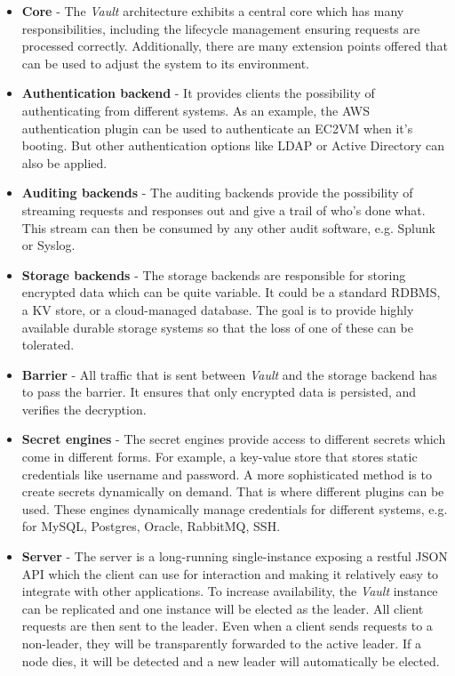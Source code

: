 \documentclass[runningheads]{llncs}
\begin{document}
\begin{itemize}

\setlength\itemsep{1mm}

\item \textbf{Core} - The \textit{Vault} architecture exhibits a central core which has many responsibilities, including the lifecycle management ensuring requests are processed correctly. Additionally, there are many extension points offered that can be used to adjust the system to its environment.

\item \textbf{Authentication backend} - It provides clients the possibility of authenticating from different systems. As an example, the AWS authentication plugin can be used to authenticate an EC2VM when it's booting. But other authentication options like LDAP or Active Directory can also be applied.

\item \textbf{Auditing backends} - The auditing backends provide the possibility of streaming requests and responses out and give a trail of who's done what. This stream can then be consumed by any other audit software, e.g. Splunk or Syslog.

\item \textbf{Storage backends} - The storage backends are responsible for storing encrypted data which can be quite variable. It could be a standard RDBMS, a KV store, or a cloud-managed database. The goal is to provide highly available durable storage systems so that the loss of one of these can be tolerated.

\item \textbf{Barrier} - All traffic that is sent between \textit{Vault} and the storage backend has to pass the barrier. It ensures that only encrypted data is persisted, and verifies the decryption.

\item \textbf{Secret engines} - The secret engines provide access to different secrets which come in different forms. For example, a key-value store that stores static credentials like username and password. A more sophisticated method is to create secrets dynamically on demand. That is where different plugins can be used. These engines dynamically manage credentials for different systems, e.g. for MySQL, Postgres, Oracle, RabbitMQ, SSH.

\item \textbf{Server} - The server is a long-running single-instance exposing a restful JSON API which the client can use for interaction and making it relatively easy to integrate with other applications. To increase availability, the \textit{Vault} instance can be replicated and one instance will be elected as the leader. All client requests are then sent to the leader. Even when a client sends requests to a non-leader, they will be transparently forwarded to the active leader. If a node dies, it will be detected and a new leader will automatically be elected.

\end{itemize}
\end{document}
